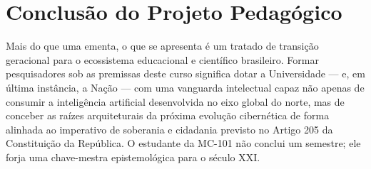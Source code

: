 \documentclass[12pt,a4paper]{article}
\begin{document}
\newpage
\section{Conclusão do Projeto Pedagógico}

Mais do que uma ementa, o que se apresenta é um tratado de transição geracional para o ecossistema educacional e científico brasileiro. Formar pesquisadores sob as premissas deste curso significa dotar a Universidade --- e, em última instância, a Nação --- com uma vanguarda intelectual capaz não apenas de consumir a inteligência artificial desenvolvida no eixo global do norte, mas de conceber as raízes arquiteturais da próxima evolução cibernética de forma alinhada ao imperativo de soberania e cidadania previsto no Artigo 205 da Constituição da República. O estudante da MC-101 não conclui um semestre; ele forja uma chave-mestra epistemológica para o século XXI.
\end{document}
